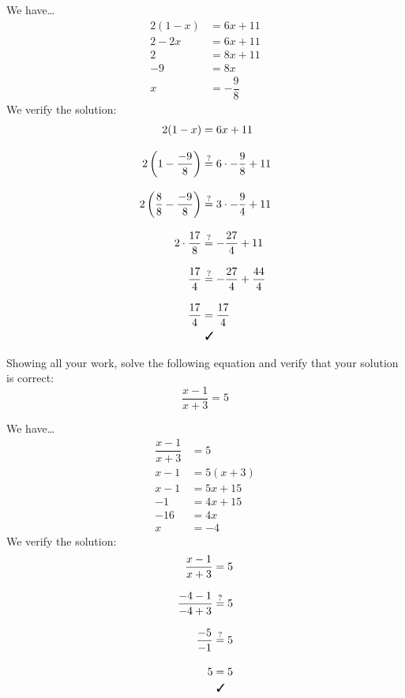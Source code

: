 \documentclass[11pt,letterpaper]{article}
\begin{document}
\sol We have\dots
	\[
	\begin{aligned}
	2(1 - x)&= 6x + 11 \\[0.3cm]
	2 - 2x&= 6x + 11 \\[0.3cm]
	2&= 8x + 11 \\[0.3cm]
	-9&= 8x \\[0.3cm]
	x&= -\dfrac{9}{8}
	\end{aligned}
	\] \pspace
We verify the solution:
	\[
	\begin{aligned}
	2(1 - x)&= 6x + 11 \\[0.3cm]
	2 \left( 1 - \dfrac{-9}{8} \right)&\stackrel{?}{=} 6 \cdot -\dfrac{9}{8} + 11 \\[0.3cm]
	2 \left( \dfrac{8}{8} - \dfrac{-9}{8} \right)&\stackrel{?}{=} 3 \cdot -\dfrac{9}{4} + 11 \\[0.3cm]
	2 \cdot \dfrac{17}{8}&\stackrel{?}{=} -\dfrac{27}{4} + 11 \\[0.3cm]
	\dfrac{17}{4}&\stackrel{?}{=} -\dfrac{27}{4} + \dfrac{44}{4} \\[0.3cm]
	\dfrac{17}{4}&= \dfrac{17}{4} \\
	&\text{ \cmark}
	\end{aligned}
	\]



\newpage



 Showing all your work, solve the following equation and verify that your solution is correct:
	\[
	\dfrac{x - 1}{x + 3}= 5
	\] \pspace

\sol We have\dots
	\[
	\begin{aligned}
	\dfrac{x - 1}{x + 3}&= 5 \\[0.3cm]
	x - 1&= 5(x + 3) \\[0.3cm]
	x - 1&= 5x + 15 \\[0.3cm]
	-1&= 4x + 15 \\[0.3cm]
	-16&= 4x \\[0.3cm]
	x&= -4 
	\end{aligned}
	\] \pspace
We verify the solution:
	\[
	\begin{aligned}
	\dfrac{x - 1}{x + 3}&= 5 \\[0.3cm]
	\dfrac{-4 - 1}{-4 + 3}&\stackrel{?}{=} 5 \\[0.3cm]
	\dfrac{-5}{-1}&\stackrel{?}{=} 5 \\[0.3cm]
	5&= 5 \\
	&\text{ \cmark}
	\end{aligned}
	\]
\end{document}
